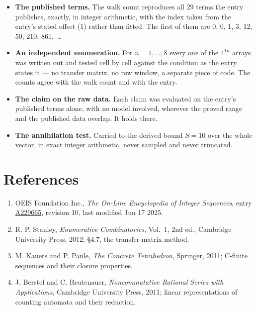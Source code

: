 \documentclass[11pt]{article}
\theoremstyle{definition}
\begin{document}
\begin{itemize}

\item {\bfseries The published terms.} The walk count reproduces all 29 terms the entry publishes, exactly, in integer arithmetic, with the index taken from the entry's stated offset (1) rather than fitted. The first of them are 0, 0, 1, 3, 12, 50, 210, 861,~\dots

\item {\bfseries An independent enumeration.} For $n = 1,\dots,8$ every one of the $4^{1n}$ arrays was written out and tested cell by cell against the condition as the entry states it --- no transfer matrix, no row window, a separate piece of code. The counts agree with the walk count and with the entry.

\item {\bfseries The claim on the raw data.} Each claim was evaluated on the entry's published terms alone, with no model involved, wherever the proved range and the published data overlap. It holds there.

\item {\bfseries The annihilation test.} Carried to the derived bound $S = 10$ over the whole vector, in exact integer arithmetic, never sampled and never truncated.

\end{itemize}

\section{References}

\begin{enumerate}

\item OEIS Foundation Inc., \emph{The On-Line Encyclopedia of Integer Sequences}, entry \href{https://oeis.org/A229665}{A229665}, revision 10, last modified Jun 17 2025.

\item R. P. Stanley, \emph{Enumerative Combinatorics}, Vol.~1, 2nd ed., Cambridge University Press, 2012; \S4.7, the transfer-matrix method.

\item M. Kauers and P. Paule, \emph{The Concrete Tetrahedron}, Springer, 2011; C-finite sequences and their closure properties.

\item J. Berstel and C. Reutenauer, \emph{Noncommutative Rational Series with Applications}, Cambridge University Press, 2011; linear representations of counting automata and their reduction.

\end{enumerate}
\end{document}
